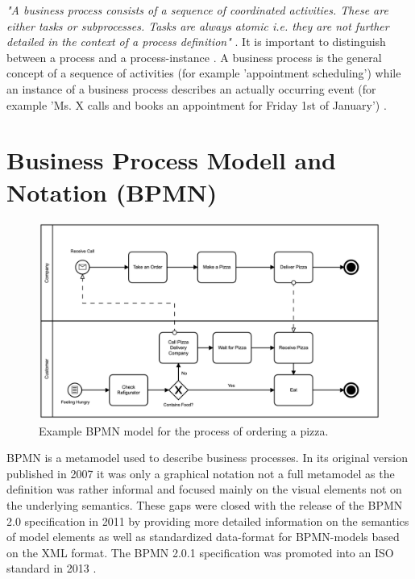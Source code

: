 \documentclass[a4paper,11pt]{article}
\begin{document}
\textit{"A business process consists of a sequence of coordinated
  activities. These are either tasks or subprocesses. Tasks are always atomic
  i.e. they are not further detailed in the context of a process definition"}
\cite[P. 1]{bpmn20}. It is important to distinguish between a process and a
process-instance \cite{BPMN}. A business process is the general concept of a
sequence of activities (for example 'appointment scheduling') while an
instance of a business process describes an actually occurring event (for
example 'Ms. X calls and books an appointment for Friday 1st of January')
\cite{alfwi}.

\section{Business Process Modell and Notation (BPMN)}
\begin{figure}[H]
  \begin{center}
    \includegraphics[width=1\textwidth]{PizzaOrder.png}
  \end{center}
  \caption{Example BPMN model for the process of ordering a pizza.}
  \label{fig:length_eight_mouse}
\end{figure}

BPMN is a metamodel used to describe business processes. In its original
version published in 2007 it was only a graphical notation not a full
metamodel as the definition was rather informal and focused mainly on the
visual elements not on the underlying semantics. These gaps were closed with
the release of the BPMN 2.0 specification in 2011 by providing more detailed
information on the semantics of model elements as well as standardized
data-format for BPMN-models based on the XML format.  The BPMN 2.0.1
specification was promoted into an ISO standard in 2013 \cite{iso}.
	
\end{document}
